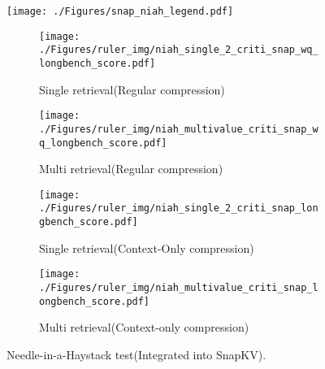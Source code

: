 \begin{figure*}[t!]
	\begin{minipage}{\linewidth}
		\centering
		\texttt{[image: ./Figures/snap\_niah\_legend.pdf]}
	\end{minipage}
	\centering
	\begin{subfigure}[b]{0.24\linewidth}
		\centering
		\texttt{[image: ./Figures/ruler\_img/niah\_single\_2\_criti\_snap\_wq\_longbench\_score.pdf]}
		\vspace{-0.4cm}
		\caption{\centering Single retrieval\newline (Regular compression)}
		\label{subfig:snapkv_single_regular}
	\end{subfigure}
	\begin{subfigure}[b]{0.24\linewidth}
		\centering
		\texttt{[image: ./Figures/ruler\_img/niah\_multivalue\_criti\_snap\_wq\_longbench\_score.pdf]}
		\vspace{-0.4cm}
		\caption{\centering Multi retrieval\newline (Regular compression) }
		\label{subfig:snapkv_multi_regular}
	\end{subfigure}
	\begin{subfigure}[b]{0.24\linewidth}
		\centering
		\texttt{[image: ./Figures/ruler\_img/niah\_single\_2\_criti\_snap\_longbench\_score.pdf]}
		\vspace{-0.4cm}
		\caption{\centering Single retrieval\newline(Context-Only compression)}
		\label{subfig:snapkv_single_context}
	\end{subfigure}
	\begin{subfigure}[b]{0.24\linewidth}
		\centering
		\texttt{[image: ./Figures/ruler\_img/niah\_multivalue\_criti\_snap\_longbench\_score.pdf]}
		\vspace{-0.4cm}
		\caption{\centering  Multi retrieval\newline(Context-only compression)}
		\label{subfig:snapkv_multi_context}
	\end{subfigure}
	\vspace{-0.2cm}
	\caption{Needle-in-a-Haystack test(Integrated into SnapKV). }
	\vspace{-0.2cm}
\end{figure*}

